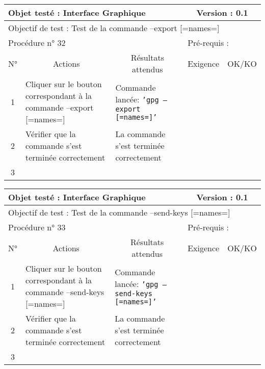 \documentclass{../res/univ-projet}
\begin{document}
\begin{center}
\begin{tabular}{|c|p{5cm}|p{5cm}|p{1.5cm}|p{1.5cm}|}
\hline
\multicolumn{3}{|l|}{Objet testé : Interface Graphique} & \multicolumn{2}{c|}{Version : 0.1}\\ \hline
\multicolumn{5}{|l|}{Objectif de test : Test de la commande –export [=names=]}\\ \hline
\multicolumn{3}{|l|}{Procédure n° 32} & \multicolumn{2}{p{3cm}|}{Pré-requis : }\\ \hline
\multicolumn{1}{|c|}{N°} & \multicolumn{1}{c|}{Actions} & \multicolumn{1}{c|}{Résultats attendus} & 
\multicolumn{1}{c|}{Exigence} & \multicolumn{1}{c|}{OK/KO}\\ \hline
1 & Cliquer sur le bouton correspondant à la commande –export [=names=] & Commande lancée: \texttt{'gpg –export [=names=]'} &  & \\
2 & Vérifier que la commande s'est terminée correctement & La commande s'est terminée correctement &  & \\
3 &  &  &  & \\ \hline
\end{tabular}
\vskip 2.2cm


\begin{tabular}{|c|p{5cm}|p{5cm}|p{1.5cm}|p{1.5cm}|}
\hline
\multicolumn{3}{|l|}{Objet testé : Interface Graphique} & \multicolumn{2}{c|}{Version : 0.1}\\ \hline
\multicolumn{5}{|l|}{Objectif de test : Test de la commande –send-keys [=names=]}\\ \hline
\multicolumn{3}{|l|}{Procédure n° 33} & \multicolumn{2}{p{3cm}|}{Pré-requis : }\\ \hline
\multicolumn{1}{|c|}{N°} & \multicolumn{1}{c|}{Actions} & \multicolumn{1}{c|}{Résultats attendus} & 
\multicolumn{1}{c|}{Exigence} & \multicolumn{1}{c|}{OK/KO}\\ \hline
1 & Cliquer sur le bouton correspondant à la commande –send-keys [=names=] & Commande lancée: \texttt{'gpg –send-keys [=names=]'} &  & \\
2 & Vérifier que la commande s'est terminée correctement & La commande s'est terminée correctement &  & \\
3 &  &  &  & \\ \hline
\end{tabular}
\vskip 2.2cm



\end{center}
\end{document}
